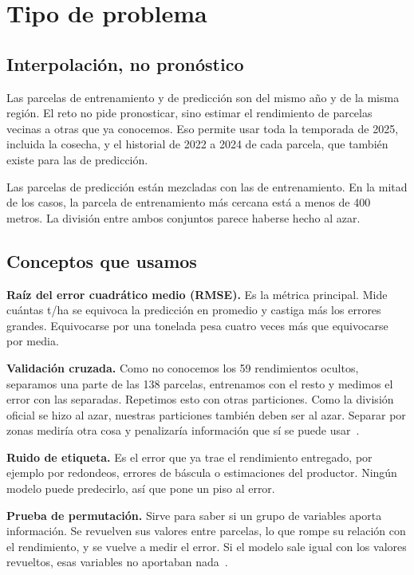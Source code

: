 \section{Tipo de problema}\label{sec:problema}

\subsection{Interpolación, no pronóstico}
Las parcelas de entrenamiento y de predicción son del mismo año y de la misma región. El reto no pide pronosticar,
sino estimar el rendimiento de parcelas vecinas a otras que ya conocemos. Eso permite usar toda la temporada de 2025,
incluida la cosecha, y el historial de 2022 a 2024 de cada parcela, que también existe para las de predicción.

Las parcelas de predicción están mezcladas con las de entrenamiento. En la mitad de los casos, la parcela de
entrenamiento más cercana está a menos de 400 metros. La división entre ambos conjuntos parece haberse hecho al azar.

\subsection{Conceptos que usamos}
\textbf{Raíz del error cuadrático medio (RMSE).} Es la métrica principal. Mide cuántas t/ha se equivoca la predicción en
promedio y castiga más los errores grandes. Equivocarse por una tonelada pesa cuatro veces más que equivocarse por
media.

\textbf{Validación cruzada.} Como no conocemos los 59 rendimientos ocultos, separamos una parte de las 138 parcelas,
entrenamos con el resto y medimos el error con las separadas. Repetimos esto con otras particiones. Como la división
oficial se hizo al azar, nuestras particiones también deben ser al azar. Separar por zonas mediría otra cosa y
penalizaría información que sí se puede usar~\cite{wadoux2021}.

\textbf{Ruido de etiqueta.} Es el error que ya trae el rendimiento entregado, por ejemplo por redondeos, errores de
báscula o estimaciones del productor. Ningún modelo puede predecirlo, así que pone un piso al error.

\textbf{Prueba de permutación.} Sirve para saber si un grupo de variables aporta información. Se revuelven sus valores
entre parcelas, lo que rompe su relación con el rendimiento, y se vuelve a medir el error. Si el modelo sale igual
con los valores revueltos, esas variables no aportaban nada~\cite{ojala2010}.

